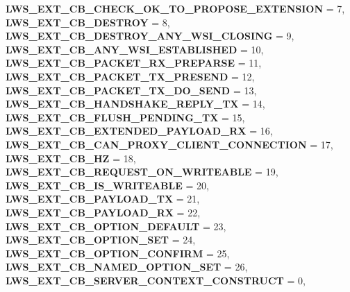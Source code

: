 \begin{DoxyCompactItemize}
\newline
{\bfseries L\+W\+S\+\_\+\+E\+X\+T\+\_\+\+C\+B\+\_\+\+C\+H\+E\+C\+K\+\_\+\+O\+K\+\_\+\+T\+O\+\_\+\+P\+R\+O\+P\+O\+S\+E\+\_\+\+E\+X\+T\+E\+N\+S\+I\+ON} = 7, 
{\bfseries L\+W\+S\+\_\+\+E\+X\+T\+\_\+\+C\+B\+\_\+\+D\+E\+S\+T\+R\+OY} = 8, 
{\bfseries L\+W\+S\+\_\+\+E\+X\+T\+\_\+\+C\+B\+\_\+\+D\+E\+S\+T\+R\+O\+Y\+\_\+\+A\+N\+Y\+\_\+\+W\+S\+I\+\_\+\+C\+L\+O\+S\+I\+NG} = 9, 
{\bfseries L\+W\+S\+\_\+\+E\+X\+T\+\_\+\+C\+B\+\_\+\+A\+N\+Y\+\_\+\+W\+S\+I\+\_\+\+E\+S\+T\+A\+B\+L\+I\+S\+H\+ED} = 10, 
\newline
{\bfseries L\+W\+S\+\_\+\+E\+X\+T\+\_\+\+C\+B\+\_\+\+P\+A\+C\+K\+E\+T\+\_\+\+R\+X\+\_\+\+P\+R\+E\+P\+A\+R\+SE} = 11, 
{\bfseries L\+W\+S\+\_\+\+E\+X\+T\+\_\+\+C\+B\+\_\+\+P\+A\+C\+K\+E\+T\+\_\+\+T\+X\+\_\+\+P\+R\+E\+S\+E\+ND} = 12, 
{\bfseries L\+W\+S\+\_\+\+E\+X\+T\+\_\+\+C\+B\+\_\+\+P\+A\+C\+K\+E\+T\+\_\+\+T\+X\+\_\+\+D\+O\+\_\+\+S\+E\+ND} = 13, 
{\bfseries L\+W\+S\+\_\+\+E\+X\+T\+\_\+\+C\+B\+\_\+\+H\+A\+N\+D\+S\+H\+A\+K\+E\+\_\+\+R\+E\+P\+L\+Y\+\_\+\+TX} = 14, 
\newline
{\bfseries L\+W\+S\+\_\+\+E\+X\+T\+\_\+\+C\+B\+\_\+\+F\+L\+U\+S\+H\+\_\+\+P\+E\+N\+D\+I\+N\+G\+\_\+\+TX} = 15, 
{\bfseries L\+W\+S\+\_\+\+E\+X\+T\+\_\+\+C\+B\+\_\+\+E\+X\+T\+E\+N\+D\+E\+D\+\_\+\+P\+A\+Y\+L\+O\+A\+D\+\_\+\+RX} = 16, 
{\bfseries L\+W\+S\+\_\+\+E\+X\+T\+\_\+\+C\+B\+\_\+\+C\+A\+N\+\_\+\+P\+R\+O\+X\+Y\+\_\+\+C\+L\+I\+E\+N\+T\+\_\+\+C\+O\+N\+N\+E\+C\+T\+I\+ON} = 17, 
{\bfseries L\+W\+S\+\_\+\+E\+X\+T\+\_\+\+C\+B\+\_\+HZ} = 18, 
\newline
{\bfseries L\+W\+S\+\_\+\+E\+X\+T\+\_\+\+C\+B\+\_\+\+R\+E\+Q\+U\+E\+S\+T\+\_\+\+O\+N\+\_\+\+W\+R\+I\+T\+E\+A\+B\+LE} = 19, 
{\bfseries L\+W\+S\+\_\+\+E\+X\+T\+\_\+\+C\+B\+\_\+\+I\+S\+\_\+\+W\+R\+I\+T\+E\+A\+B\+LE} = 20, 
{\bfseries L\+W\+S\+\_\+\+E\+X\+T\+\_\+\+C\+B\+\_\+\+P\+A\+Y\+L\+O\+A\+D\+\_\+\+TX} = 21, 
{\bfseries L\+W\+S\+\_\+\+E\+X\+T\+\_\+\+C\+B\+\_\+\+P\+A\+Y\+L\+O\+A\+D\+\_\+\+RX} = 22, 
\newline
{\bfseries L\+W\+S\+\_\+\+E\+X\+T\+\_\+\+C\+B\+\_\+\+O\+P\+T\+I\+O\+N\+\_\+\+D\+E\+F\+A\+U\+LT} = 23, 
{\bfseries L\+W\+S\+\_\+\+E\+X\+T\+\_\+\+C\+B\+\_\+\+O\+P\+T\+I\+O\+N\+\_\+\+S\+ET} = 24, 
{\bfseries L\+W\+S\+\_\+\+E\+X\+T\+\_\+\+C\+B\+\_\+\+O\+P\+T\+I\+O\+N\+\_\+\+C\+O\+N\+F\+I\+RM} = 25, 
{\bfseries L\+W\+S\+\_\+\+E\+X\+T\+\_\+\+C\+B\+\_\+\+N\+A\+M\+E\+D\+\_\+\+O\+P\+T\+I\+O\+N\+\_\+\+S\+ET} = 26, 
\newline
{\bfseries L\+W\+S\+\_\+\+E\+X\+T\+\_\+\+C\+B\+\_\+\+S\+E\+R\+V\+E\+R\+\_\+\+C\+O\+N\+T\+E\+X\+T\+\_\+\+C\+O\+N\+S\+T\+R\+U\+CT} = 0, 

\end{DoxyCompactItemize}
